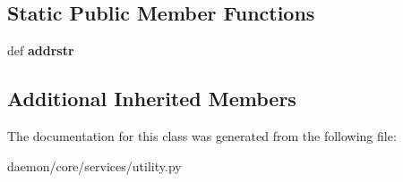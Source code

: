 \subsection*{Static Public Member Functions}
\begin{DoxyCompactItemize}
\item 
\hypertarget{classcore_1_1services_1_1utility_1_1_default_route_service_ab60ae83de4bd114eef8080840112c7bd}{def {\bfseries addrstr}}\label{classcore_1_1services_1_1utility_1_1_default_route_service_ab60ae83de4bd114eef8080840112c7bd}

\end{DoxyCompactItemize}
\subsection*{Additional Inherited Members}


The documentation for this class was generated from the following file\+:\begin{DoxyCompactItemize}
\item 
daemon/core/services/utility.\+py\end{DoxyCompactItemize}
